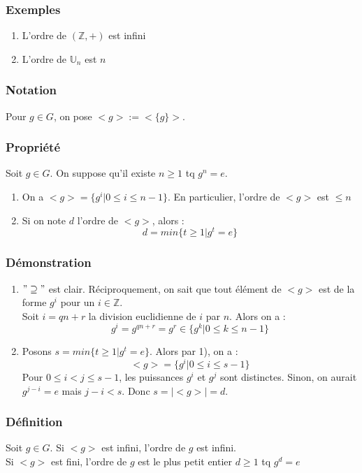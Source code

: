 \documentclass[a4paper, oneside]{report}
\newcommand{\Z}{\mathbb{Z}}
\newcommand{\U}{\mathbb{U}}
\begin{document}
\subsubsection{Exemples}
\begin{enumerate}
\item L'ordre de $(\Z,+)$ est infini
\item L'ordre de $\U_n$ est $n$
\end{enumerate}

\subsubsection{Notation}
Pour $g\in G$, on pose $<g> := <\{ g \}>$.

\subsubsection{Propriété}
Soit $g\in G$. On suppose qu'il existe $n\geq 1$ tq $g^n=e$.
\begin{enumerate}
\item On a $<g> = \{g^i | 0\leq i \leq n-1 \}$. En particulier, l'ordre de $<g>$ est $\leq n$
\item Si on note $d$ l'ordre de $<g>$, alors :
$$d=min\{t\geq 1 | g^t=e \}$$
\end{enumerate}

\subsubsection{Démonstration}
\begin{enumerate}
\item $"\supseteq"$ est clair. Réciproquement, on sait que tout élément de $<g>$ est de la forme $g^i$ pour un $i \in \Z$.\\
Soit $i=qn+r$ la division euclidienne de $i$ par $n$. Alors on a :
$$g^i=g^{qn+r}=g^r \in \{g^k | 0\leq k \leq n-1 \}$$

\item Posons $s=min\{t \geq 1 | g^t=e \}$. Alors par 1), on a :
$$<g> = \{g^i | 0\leq i \leq s-1 \}$$
Pour $0\leq i < j \leq s-1$, les puissances $g^i$ et $g^j$ sont distinctes. Sinon, on aurait $g^{j-i}=e$ mais $j-i<s$. Donc $s=|<g>| = d$.
\end{enumerate}

\subsubsection{Définition}
Soit $g\in G$. Si $<g>$ est infini, l'ordre de $g$ est infini.\\
Si $<g>$ est fini, l'ordre de $g$ est le plus petit entier $d\geq 1$ tq $g^d=e$
\end{document}

